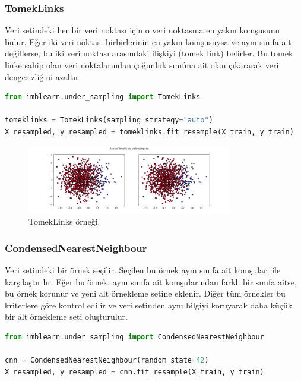 \newpage

\subsubsection{TomekLinks}
Veri setindeki her bir veri noktası için o veri noktasına en yakın komşusunu bulur. Eğer iki veri noktası birbirlerinin en yakın komşusuysa ve aynı sınıfa ait değillerse, bu iki veri noktası arasındaki ilişkiyi (tomek link) belirler. Bu tomek linke sahip olan veri noktalarından çoğunluk sınıfına ait olan çıkararak veri dengesizliğini azaltır.

\begin{lstlisting}[language=Python]
from imblearn.under_sampling import TomekLinks

tomeklinks = TomekLinks(sampling_strategy="auto")
X_resampled, y_resampled = tomeklinks.fit_resample(X_train, y_train)
\end{lstlisting}

\begin{figure}[h]
    \centering
    \includegraphics[width=0.8\textwidth]{images/Raw vs TomekLinks undersampling.png}
    \caption{TomekLinks örneği.}
    \label{fig:enter-label}
\end{figure}

\newpage

\subsubsection{CondensedNearestNeighbour}
Veri setindeki bir örnek seçilir. Seçilen bu örnek aynı sınıfa ait komşuları ile karşılaştırılır. Eğer bu örnek, aynı sınıfa ait komşularından farklı bir sınıfa aitse, bu örnek korunur ve yeni alt örnekleme setine eklenir. Diğer tüm örnekler bu kriterlere göre kontrol edilir ve veri setinden aynı bilgiyi koruyarak daha küçük bir alt örnekleme seti oluşturulur.

\begin{lstlisting}[language=Python]
from imblearn.under_sampling import CondensedNearestNeighbour

cnn = CondensedNearestNeighbour(random_state=42)
X_resampled, y_resampled = cnn.fit_resample(X_train, y_train)
\end{lstlisting}

